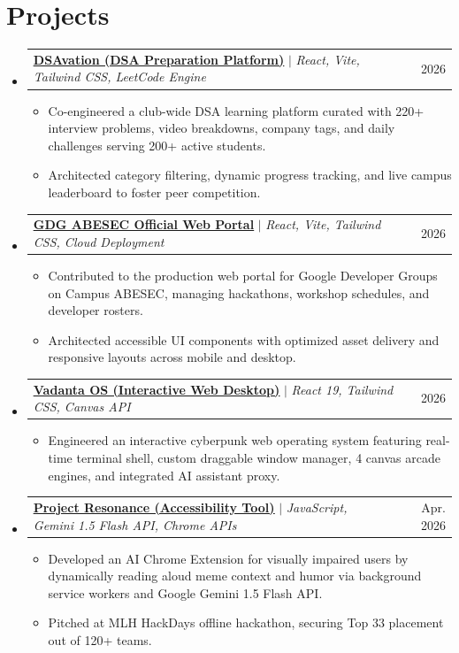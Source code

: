 \documentclass[letterpaper,11pt]{article}
\makeatletter
\newcommand{\resumeItem}[1]{
  \item\small{
    {#1 \vspace{-2pt}}
  }
}
\newcommand{\resumeProjectHeading}[2]{
  \vspace{-2pt}\item
    \begin{tabular*}{0.97\textwidth}{l@{\extracolsep{\fill}}r}
      \small#1 & #2 \\
    \end{tabular*}\vspace{-7pt}
}
\newcommand{\resumeSubHeadingListStart}{\begin{itemize}[leftmargin=0.15in, label={}]}
\newcommand{\resumeSubHeadingListEnd}{\end{itemize}}
\newcommand{\resumeItemListStart}{\begin{itemize}}
\newcommand{\resumeItemListEnd}{\end{itemize}\vspace{-5pt}}
\makeatother
\begin{document}
\section{Projects}
    \resumeSubHeadingListStart
      \resumeProjectHeading
          {\textbf{\href{https://dsavation.vercel.app}{\underline{DSAvation (DSA Preparation Platform)}}} $|$ \emph{React, Vite, Tailwind CSS, LeetCode Engine}}{2026}
          \resumeItemListStart
            \resumeItem{Co-engineered a club-wide DSA learning platform curated with 220+ interview problems, video breakdowns, company tags, and daily challenges serving 200+ active students.}
            \resumeItem{Architected category filtering, dynamic progress tracking, and live campus leaderboard to foster peer competition.}
          \resumeItemListEnd
      \resumeProjectHeading
          {\textbf{\href{https://gdgabesec.xyz}{\underline{GDG ABESEC Official Web Portal}}} $|$ \emph{React, Vite, Tailwind CSS, Cloud Deployment}}{2026}
          \resumeItemListStart
            \resumeItem{Contributed to the production web portal for Google Developer Groups on Campus ABESEC, managing hackathons, workshop schedules, and developer rosters.}
            \resumeItem{Architected accessible UI components with optimized asset delivery and responsive layouts across mobile and desktop.}
          \resumeItemListEnd
      \resumeProjectHeading
          {\textbf{\href{https://github.com/VedisVigourous/project-citadel}{\underline{Vadanta OS (Interactive Web Desktop)}}} $|$ \emph{React 19, Tailwind CSS, Canvas API}}{2026}
          \resumeItemListStart
            \resumeItem{Engineered an interactive cyberpunk web operating system featuring real-time terminal shell, custom draggable window manager, 4 canvas arcade engines, and integrated AI assistant proxy.}
          \resumeItemListEnd
      \resumeProjectHeading
          {\textbf{\href{https://github.com/hobo7676/hackdays-spiker}{\underline{Project Resonance (Accessibility Tool)}}} $|$ \emph{JavaScript, Gemini 1.5 Flash API, Chrome APIs}}{Apr. 2026}
          \resumeItemListStart
            \resumeItem{Developed an AI Chrome Extension for visually impaired users by dynamically reading aloud meme context and humor via background service workers and Google Gemini 1.5 Flash API.}
            \resumeItem{Pitched at MLH HackDays offline hackathon, securing Top 33 placement out of 120+ teams.}
          \resumeItemListEnd
    \resumeSubHeadingListEnd

\end{document}
